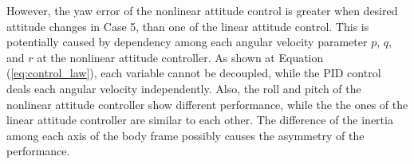 However, the yaw error of the nonlinear attitude control is greater when desired attitude changes in Case 5, than one of the linear attitude control. This is potentially caused by dependency among each angular velocity parameter \(p\), \(q\), and \(r\) at the nonlinear attitude controller. As shown at Equation (\ref{eq:control_law}), each variable cannot be decoupled, while the PID control deals each angular velocity independently. Also, the roll and pitch of the nonlinear attitude controller show different performance, while the the ones of the linear attitude controller are similar to each other. The difference of the inertia among each axis of the body frame possibly causes the asymmetry of the performance.